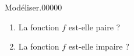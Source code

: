 \begin{pageAD}
\begin{minipage}{0.48 \linewidth}
\begin{ExoCadN}{Modéliser.}{0}{0}{0}{0}{0}
\begin{enumerate}[leftmargin=*]
\item La fonction $f$ est-elle paire ?


\item La fonction $f$ est-elle impaire ?

\end{enumerate}

\end{ExoCadN}
 \end{minipage}
 
\end{pageAD} %



